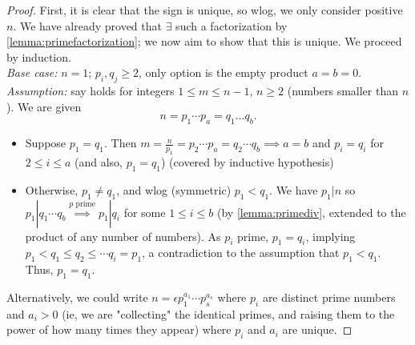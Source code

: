 \documentclass[12pt,oneside]{article}
\begin{document}
\begin{proof}
  First, it is clear that the sign is unique, so wlog, we only consider positive $n$. We have already proved that $\exists$ such a factorization by \cref{lemma:primefactorization}; we now aim to show that this is unique. We proceed by induction.\\
  \textit{Base case:} $n = 1$; $p_i,q_j \geq 2$, only option is the empty product $a = b = 0$.\\
  \textit{Assumption:} say holds for integers $1 \leq m \leq n -1$, $n \geq 2$ (numbers smaller than $n$). We are given \[n = p_1 \cdots p_a = q_1 \dots q_b.\]
  \begin{itemize}
    \item Suppose $p_1 = q_1$. Then $m = \frac{n}{p_1} = p_2 \cdots p_a = q_2 \cdots q_b \implies a = b$ and $p_i = q_i$ for $2 \leq i \leq a$ (and also, $p_1 = q_1$) (covered by inductive hypothesis)
    \item Otherwise, $p_1 \neq q_1$, and wlog (symmetric) $p_1 < q_1$. We have $p_1 | n$ so $p_1 | q_1 \cdots q_b \overset{p \text{ prime}}{\implies} p_1 | q_i$ for some $1 \leq i \leq b$ (by \cref{lemma:primediv}, extended to the product of any number of numbers). As $p_i$ prime, $p_1 = q_i$, implying $p_1 < q_1 \leq q_2 \leq \cdots q_i = p_1$, a contradiction to the assumption that $p_1 < q_1$. Thus, $p_1 = q_1$.
  \end{itemize}

  Alternatively, we could write $n = \epsilon p_1^{a_1} \cdots p_s^{a_s}$ where $p_i$ are distinct prime numbers and $a_i > 0$ (ie, we are "collecting" the identical primes, and raising them to the power of how many times they appear) where $p_i$ and $a_i$ are unique.
\end{proof}
\end{document}
